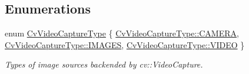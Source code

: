 \subsection*{Enumerations}
\begin{DoxyCompactItemize}
\item 
enum \hyperlink{namespacestereo__ugv_a5c139e7cfac12e9270ca903f1ce2e4bc}{Cv\+Video\+Capture\+Type} \{ \hyperlink{namespacestereo__ugv_a5c139e7cfac12e9270ca903f1ce2e4bcaddf0d6b21537d984fea6544f58101fa8}{Cv\+Video\+Capture\+Type\+::\+C\+A\+M\+E\+RA}, 
\hyperlink{namespacestereo__ugv_a5c139e7cfac12e9270ca903f1ce2e4bcab34687a3607271050f02aa9bf90c731a}{Cv\+Video\+Capture\+Type\+::\+I\+M\+A\+G\+ES}, 
\hyperlink{namespacestereo__ugv_a5c139e7cfac12e9270ca903f1ce2e4bcae60ae31f67ab883c746bb71c7a145c18}{Cv\+Video\+Capture\+Type\+::\+V\+I\+D\+EO}
 \}\begin{DoxyCompactList}\small\item\em Types of image sources backended by cv\+::\+Video\+Capture. \end{DoxyCompactList}
\end{DoxyCompactItemize}
